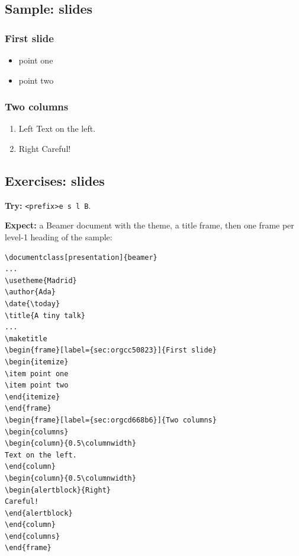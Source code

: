 \subsection{Sample: slides}
\label{sec:orgedb6c51}
\subsubsection{First slide}
\label{sec:org86f8e79}
\begin{itemize}
\item point one
\item point two
\end{itemize}
\subsubsection{Two columns}
\label{sec:org94b392a}
\begin{enumerate}
\item Left
\label{sec:org09ddd66}
Text on the left.
\item Right
\label{sec:org4257b0b}
Careful!
\end{enumerate}
\subsection{Exercises: slides}
\label{sec:orgd18ddfe}
\textbf{Try:} \texttt{<prefix>e s l B}.

\textbf{Expect:} a Beamer document with the theme, a title frame, then one frame
per level-1 heading of the sample:

\begin{verbatim}
\documentclass[presentation]{beamer}
...
\usetheme{Madrid}
\author{Ada}
\date{\today}
\title{A tiny talk}
...
\maketitle
\begin{frame}[label={sec:orgcc50823}]{First slide}
\begin{itemize}
\item point one
\item point two
\end{itemize}
\end{frame}
\begin{frame}[label={sec:orgcd668b6}]{Two columns}
\begin{columns}
\begin{column}{0.5\columnwidth}
Text on the left.
\end{column}
\begin{column}{0.5\columnwidth}
\begin{alertblock}{Right}
Careful!
\end{alertblock}
\end{column}
\end{columns}
\end{frame}
\end{verbatim}
